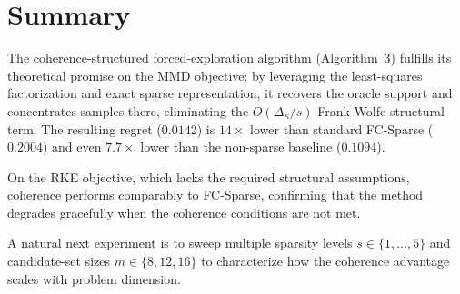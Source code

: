 \documentclass[11pt]{article}
\newcommand{\1}{\mathbf{1}}
\begin{document}
\section{Summary}

The coherence-structured forced-exploration algorithm (Algorithm~3) fulfills its theoretical promise on the MMD objective: by leveraging the least-squares factorization and exact sparse representation, it recovers the oracle support and concentrates samples there, eliminating the $O(\Delta_\kappa/s)$ Frank-Wolfe structural term. The resulting regret ($0.0142$) is $14\times$ lower than standard FC-Sparse ($0.2004$) and even $7.7\times$ lower than the non-sparse baseline ($0.1094$).

On the RKE objective, which lacks the required structural assumptions, coherence performs comparably to FC-Sparse, confirming that the method degrades gracefully when the coherence conditions are not met.

A natural next experiment is to sweep multiple sparsity levels $s \in \{1,\dots,5\}$ and candidate-set sizes $m \in \{8,12,16\}$ to characterize how the coherence advantage scales with problem dimension.
\end{document}
